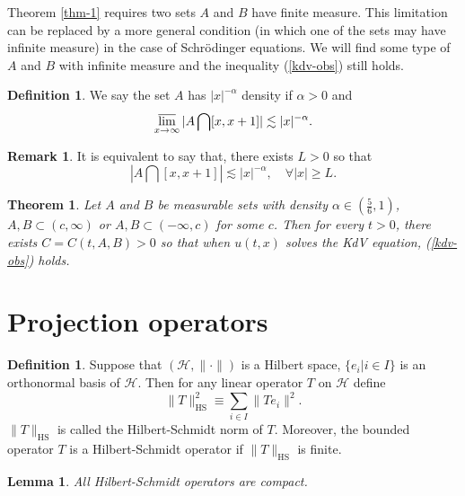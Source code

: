 \documentclass[12pt]{amsart}
\newtheorem{theorem}[proposition]{Theorem}
\newtheorem{lemma}[proposition]{Lemma}
\theoremstyle{definition}
\newtheorem{definition}[proposition]{Definition}
\newtheorem{remark}[proposition]{Remark}
\numberwithin{equation}{section}
\begin{document}
Theorem \ref{thm-1} requires two sets $A$ and $B$ have finite measure. This limitation can be replaced by a more general condition (in which one of the sets may have infinite measure) in the case of Schr\"{o}dinger equations. We will find some type of  $A$ and $B$ with infinite measure and the inequality (\ref{kdv-obs}) still holds.

\begin{definition}
    We say the set $A$ has $|x|^{-\alpha}$ density if $\alpha>0$ and 
    $$
    \varlimsup_{x\to \infty}|A\bigcap[x,x+1]|\lesssim |x|^{-\alpha}.
    $$
\end{definition}
\begin{remark}
    It is equivalent to say that, there exists $L>0$ so that
    $$
        |A\bigcap[x,x+1]|\lesssim |x|^{-\alpha}, \quad \forall |x|\geq L.
    $$
\end{remark}
\begin{theorem}\label{thm-2}
    Let  $A$ and $B$ be measurable sets with density  $\alpha\in (\frac{5}{6},1)$, $A,B\subset (c,\infty)$ or $A,B\subset (-\infty,c)$  for some $c$. Then for every $t>0$, there exists $C=C(t,A,B)>0$ so that when $u(t,x)$  solves the KdV equation, (\ref{kdv-obs}) holds.     
\end{theorem}
\section{Projection operators}
\begin{definition}
    Suppose that $(\mathcal{H},\|\cdot\|)$ is a Hilbert space, $\{e_i\lvert i\in I\}$ is an orthonormal basis of $\mathcal{H}$. Then for any linear operator $T$ on $\mathcal{H}$ define 
    $$
        \| T\|^2_{\mathrm{HS}}\equiv \sum_{i\in I}\|Te_i\|^2.
    $$       
$\|T\|_{\mathrm{HS}}$ is called the Hilbert-Schmidt norm of $T$. Moreover, the bounded operator $T$ is a Hilbert-Schmidt operator if $\|T\|_{\mathrm{HS}}$ is finite.    
\end{definition}
\begin{lemma}\label{lma-1} 
    All Hilbert-Schmidt operators are compact.
\end{lemma}
\end{document}
